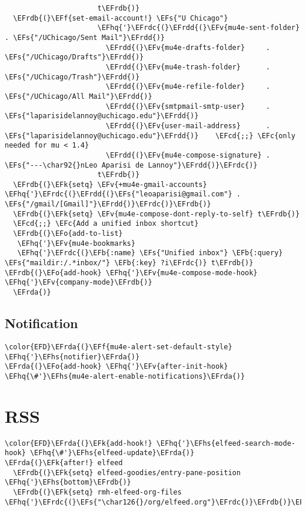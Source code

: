 \documentclass[c]{article}
\theoremstyle{plain}%
\theoremstyle{definition}
\theoremstyle{remark}
\newcommand{\EFc}[1]{\textcolor{EFc}{#1}} %
\newcommand{\EFcd}[1]{\textcolor{EFcd}{#1}} %
\newcommand{\EFs}[1]{\textcolor{EFs}{#1}} %
\newcommand{\EFk}[1]{\textcolor{EFk}{#1}} %
\newcommand{\EFb}[1]{\textcolor{EFb}{#1}} %
\newcommand{\EFf}[1]{\textcolor{EFf}{#1}} %
\newcommand{\EFv}[1]{\textcolor{EFv}{#1}} %
\newcommand{\EFo}[1]{\textcolor{EFo}{#1}} %
\newcommand{\EFhq}[1]{\textcolor{EFhq}{#1}} %
\newcommand{\EFhs}[1]{\textcolor{EFhs}{#1}} %
\newcommand{\EFrda}[1]{\textcolor{EFrda}{#1}} %
\newcommand{\EFrdb}[1]{\textcolor{EFrdb}{#1}} %
\newcommand{\EFrdc}[1]{\textcolor{EFrdc}{#1}} %
\newcommand{\EFrdd}[1]{\textcolor{EFrdd}{#1}} %
\begin{document}
\begin{Code}
\begin{Verbatim}
                      t\EFrdb{)}
  \EFrdb{(}\EFf{set-email-account!} \EFs{"U Chicago"}
                      \EFhq{'}\EFrdc{(}\EFrdd{(}\EFv{mu4e-sent-folder}       . \EFs{"/UChicago/Sent Mail"}\EFrdd{)}
                        \EFrdd{(}\EFv{mu4e-drafts-folder}     . \EFs{"/UChicago/Drafts"}\EFrdd{)}
                        \EFrdd{(}\EFv{mu4e-trash-folder}      . \EFs{"/UChicago/Trash"}\EFrdd{)}
                        \EFrdd{(}\EFv{mu4e-refile-folder}     . \EFs{"/UChicago/All Mail"}\EFrdd{)}
                        \EFrdd{(}\EFv{smtpmail-smtp-user}     . \EFs{"laparisidelannoy@uchicago.edu"}\EFrdd{)}
                        \EFrdd{(}\EFv{user-mail-address}      . \EFs{"laparisidelannoy@uchicago.edu"}\EFrdd{)}    \EFcd{;;} \EFc{only needed for mu < 1.4}
                        \EFrdd{(}\EFv{mu4e-compose-signature} . \EFs{"---\char92{}nLeo Aparisi de Lannoy"}\EFrdd{)}\EFrdc{)}
                      t\EFrdb{)}
  \EFrdb{(}\EFk{setq} \EFv{+mu4e-gmail-accounts} \EFhq{'}\EFrdc{(}\EFrdd{(}\EFs{"leoaparisi@gmail.com"} . \EFs{"/gmail/[Gmail]"}\EFrdd{)}\EFrdc{)}\EFrdb{)}
  \EFrdb{(}\EFk{setq} \EFv{mu4e-compose-dont-reply-to-self} t\EFrdb{)}
  \EFcd{;;} \EFc{Add a unified inbox shortcut}
  \EFrdb{(}\EFo{add-to-list}
   \EFhq{'}\EFv{mu4e-bookmarks}
   \EFhq{'}\EFrdc{(}\EFb{:name} \EFs{"Unified inbox"} \EFb{:query} \EFs{"maildir:/.*inbox/"} \EFb{:key} ?i\EFrdc{)} t\EFrdb{)}
\EFrdb{(}\EFo{add-hook} \EFhq{'}\EFv{mu4e-compose-mode-hook} \EFhq{'}\EFv{company-mode}\EFrdb{)}
  \EFrda{)}
\end{Verbatim}
\end{Code}
\subsection{Notification}
\label{sec:orga69a0ba}
\begin{Code}
\begin{Verbatim}
\color{EFD}\EFrda{(}\EFf{mu4e-alert-set-default-style} \EFhq{'}\EFhs{notifier}\EFrda{)}
\EFrda{(}\EFo{add-hook} \EFhq{'}\EFv{after-init-hook} \EFhq{\#'}\EFhs{mu4e-alert-enable-notifications}\EFrda{)}
\end{Verbatim}
\end{Code}
\section{RSS}
\label{sec:org4892509}
\begin{Code}
\begin{Verbatim}
\color{EFD}\EFrda{(}\EFk{add-hook!} \EFhq{'}\EFhs{elfeed-search-mode-hook} \EFhq{\#'}\EFhs{elfeed-update}\EFrda{)}
\EFrda{(}\EFk{after!} elfeed
  \EFrdb{(}\EFk{setq} elfeed-goodies/entry-pane-position \EFhq{'}\EFhs{bottom}\EFrdb{)}
  \EFrdb{(}\EFk{setq} rmh-elfeed-org-files \EFhq{'}\EFrdc{(}\EFs{"\char126{}/org/elfeed.org"}\EFrdc{)}\EFrdb{)}\EFrda{)}
\end{Verbatim}
\end{Code}
\end{document}
